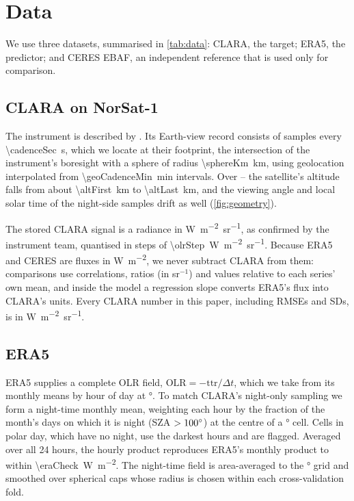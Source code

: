 \documentclass[10pt,twocolumn,a4paper]{article}
\newcommand{\Wmsr}{\si{W.m^{-2}.sr^{-1}}}   %
\newcommand{\Wm}{\si{W.m^{-2}}}             %
\newcommand{\clara}[1]{\SI{#1}{W.m^{-2}.sr^{-1}}}
\newcommand{\flux}[1]{\SI{#1}{W.m^{-2}}}
\begin{document}
\section{Data}\label{sec:data}

We use three datasets, summarised in \cref{tab:data}: CLARA, the target; ERA5, the predictor; and CERES EBAF, an independent reference that is used only for comparison.

\subsection{CLARA on NorSat-1}
The instrument is described by \citet{walter2017clara}. Its Earth-view record consists of samples every \SI{\cadenceSec}{s}, which we locate at their footprint, the intersection of the instrument's boresight with a sphere of radius \SI{\sphereKm}{km}, using geolocation interpolated from \SI{\geoCadenceMin}{min} intervals. Over \firstYear--\lastYear{} the satellite's altitude falls from about \SI{\altFirst}{km} to \SI{\altLast}{km}, and the viewing angle and local solar time of the night-side samples drift as well (\cref{fig:geometry}).

The stored CLARA signal is a radiance in \Wmsr, as confirmed by the instrument team, quantised in steps of \clara{\olrStep}. Because ERA5 and CERES are fluxes in \Wm, we never subtract CLARA from them: comparisons use correlations, ratios (in sr$^{-1}$) and values relative to each series' own mean, and inside the model a regression slope converts ERA5's flux into CLARA's units. Every CLARA number in this paper, including RMSEs and SDs, is in \Wmsr.

\subsection{ERA5}
ERA5 supplies a complete OLR field, $\mathrm{OLR}=-\mathrm{ttr}/\Delta t$, which we take from its monthly means by hour of day at \eraResDeg°. To match CLARA's night-only sampling we form a night-time monthly mean, weighting each hour by the fraction of the month's days on which it is night (SZA $>100^\circ$) at the centre of a \nightGridDeg° cell. Cells in polar day, which have no night, use the \nDarkest{} darkest hours and are flagged. Averaged over all 24 hours, the hourly product reproduces ERA5's monthly product to within \flux{\eraCheck}. The night-time field is area-averaged to the \gridRes° grid and smoothed over spherical caps whose radius is chosen within each cross-validation fold.
\end{document}
